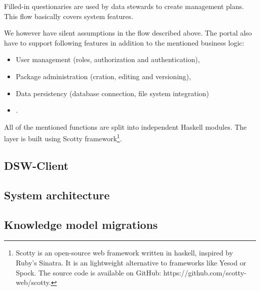 Filled-in questionaries are used by data stewards to create management plans.
This flow basically covers system features.

We however have silent assumptions in the flow described above.
The portal also have to support following features in addition to the mentioned business logic:

\begin{itemize}
    \item User management (roles, authorization and authentication),
    \item Package administration (cration, editing and versioning),
    \item Data persistency (database connection, file system integration)
    \item {} .
\end{itemize}

All of the mentioned functions are split into independent Haskell modules.
The   layer is built using Scotty framework\footnote{Scotty is an open-source web framework written in haskell, inspired by Ruby's Sinatra. It is an lightweight alternative to frameworks like Yesod or Spock. The source code is available on GitHub: https://github.com/scotty-web/scotty.}.

\subsection{DSW-Client}

\subsection{System architecture}

\subsection{Knowledge model migrations}
